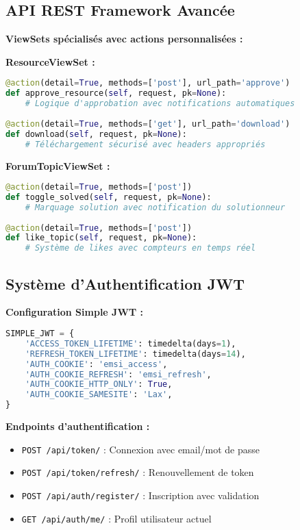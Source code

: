 \documentclass[12pt,a4paper]{article}
\begin{document}
\subsection{API REST Framework Avancée}

\textbf{ViewSets spécialisés avec actions personnalisées :}

\textbf{ResourceViewSet :}
\begin{lstlisting}[language=Python]
@action(detail=True, methods=['post'], url_path='approve')
def approve_resource(self, request, pk=None):
    # Logique d'approbation avec notifications automatiques
    
@action(detail=True, methods=['get'], url_path='download') 
def download(self, request, pk=None):
    # Téléchargement sécurisé avec headers appropriés
\end{lstlisting}

\textbf{ForumTopicViewSet :}
\begin{lstlisting}[language=Python]
@action(detail=True, methods=['post'])
def toggle_solved(self, request, pk=None):
    # Marquage solution avec notification du solutionneur
    
@action(detail=True, methods=['post'])
def like_topic(self, request, pk=None):
    # Système de likes avec compteurs en temps réel
\end{lstlisting}

\subsection{Système d'Authentification JWT}

\textbf{Configuration Simple JWT :}
\begin{lstlisting}[language=Python]
SIMPLE_JWT = {
    'ACCESS_TOKEN_LIFETIME': timedelta(days=1),
    'REFRESH_TOKEN_LIFETIME': timedelta(days=14),
    'AUTH_COOKIE': 'emsi_access',
    'AUTH_COOKIE_REFRESH': 'emsi_refresh',
    'AUTH_COOKIE_HTTP_ONLY': True,
    'AUTH_COOKIE_SAMESITE': 'Lax',
}
\end{lstlisting}

\textbf{Endpoints d'authentification :}
\begin{itemize}
    \item \texttt{POST /api/token/} : Connexion avec email/mot de passe
    \item \texttt{POST /api/token/refresh/} : Renouvellement de token
    \item \texttt{POST /api/auth/register/} : Inscription avec validation
    \item \texttt{GET /api/auth/me/} : Profil utilisateur actuel
\end{itemize}
\end{document}
